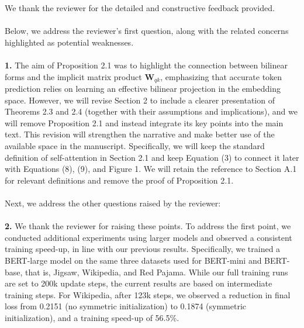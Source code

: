 \documentclass[11pt]{article}
\begin{document}
We thank the reviewer for the detailed and constructive feedback provided. 
%
\\\\
%
Below, we address the reviewer’s first question, along with the related concerns highlighted as potential weaknesses.
% 
\\\\
%
\textbf{1.} The aim of Proposition 2.1 was to highlight the connection between bilinear forms and the implicit matrix product $\mathbf{W}_{qk}$, emphasizing that accurate token prediction relies on learning an effective bilinear projection in the embedding space. %
However,  we will revise Section 2 to include a clearer presentation of Theorems 2.3 and 2.4 (together with their assumptions and implications), and we will remove Proposition 2.1 and instead integrate its key points into the main text. This revision will strengthen the narrative and make better use of the available space in the manuscript. Specifically, we will keep the standard definition of self-attention in Section 2.1 and keep Equation (3) to connect it later with Equations (8), (9), and Figure 1. We will retain the reference to Section A.1 for relevant definitions and remove the proof of Proposition 2.1.
%
\\\\
%
Next, we address the other questions raised by the reviewer:
%
\\\\
%
%
%
%
%
%
%
\textbf{2.} We thank the reviewer for raising these points. To address the first point, we conducted additional experiments using larger models and observed a consistent training speed-up, in line with our previous results. Specifically, we trained a BERT-large model on the same three datasets used for BERT-mini and BERT-base, that is, Jigsaw, Wikipedia, and Red Pajama. While our full training runs are set to 200k update steps, the current results are based on intermediate training steps.
For Wikipedia, after 123k steps, we observed a reduction in final loss from 0.2151 (no symmetric initialization) to 0.1874 (symmetric initialization), and a training speed-up of 56.5\%.
\end{document}
